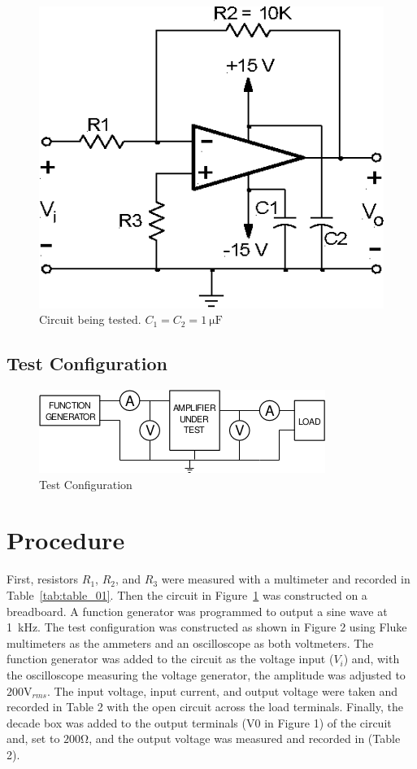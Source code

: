 \documentclass{article}
\begin{document}
\begin{figure}[hbtp]
  \centering
    \includegraphics[]{img/ckt_tested}
  \caption{Circuit being tested.  $C_1 = C_2 = \SI{1}{\micro\farad}$}
  \label{fig:circuit}
\end{figure}

\subsection*{Test Configuration}
\label{sec:test_config}

\begin{figure}[hbtp]
  \centering
  \includegraphics[]{img/test_config}
  \caption{Test Configuration}
  \label{fig:test_config}
\end{figure}

\section{Procedure}
\label{sec:procedure}

First, resistors $R_1$, $R_2$, and $R_3$ were measured with a
multimeter and recorded in Table~\ref{tab:table_01}.  Then the circuit
in Figure~\ref{fig:circuit} was constructed on a breadboard.  A function
generator was programmed to output a sine wave at \SI{1}{\kilo\hertz}.
The test configuration was constructed as shown in Figure 2 using
Fluke multimeters as the ammeters and an oscilloscope as both
voltmeters.  The function generator was added to the circuit as the
voltage input ($V_i$) and, with the oscilloscope measuring the voltage
generator, the amplitude was adjusted to $200\si{\volt_{rms}}$.  The
input voltage, input current, and output voltage were taken and
recorded in Table 2 with the open circuit across the load terminals.
Finally, the decade box was added to the output terminals (V0 in
Figure 1) of the circuit and, set to $200 \si{\ohm}$, and the output
voltage was measured and recorded in (Table 2).
\end{document}
